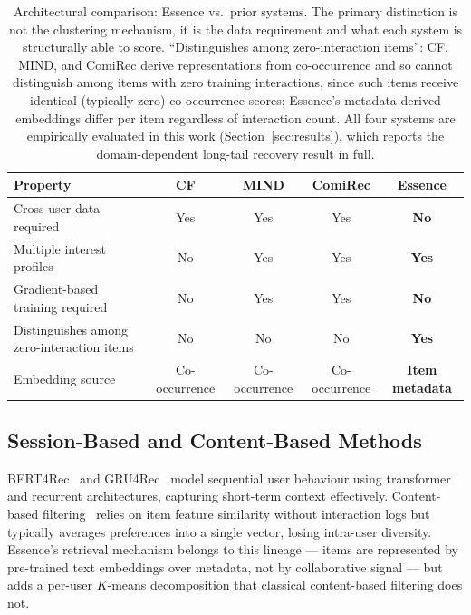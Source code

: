 \documentclass[11pt,a4paper]{article}
\begin{document}
\begin{table}[H]
\centering
\caption{Architectural comparison: Essence vs.\ prior systems.
         The primary distinction is not the clustering mechanism,
         it is the data requirement and what each system is structurally
         able to score. ``Distinguishes among zero-interaction items'':
         CF, MIND, and ComiRec derive representations from co-occurrence
         and so cannot distinguish among items with zero training
         interactions, since such items receive identical (typically
         zero) co-occurrence scores; Essence's metadata-derived
         embeddings differ per item regardless of interaction count.
         All four systems are empirically evaluated in this work
         (Section~\ref{sec:results}), which reports the domain-dependent
         long-tail recovery result in full.}
\label{tab:comparison}
\begin{tabular}{lcccc}
\toprule
\textbf{Property} & \textbf{CF} & \textbf{MIND} & \textbf{ComiRec}
                  & \textbf{Essence} \\
\midrule
Cross-user data required    & Yes  & Yes  & Yes  & \textbf{No}  \\
Multiple interest profiles  & No   & Yes  & Yes  & \textbf{Yes} \\
Gradient-based training required & No  & Yes  & Yes  & \textbf{No}  \\
Distinguishes among zero-interaction items & No & No & No & \textbf{Yes} \\
Embedding source            & Co-occurrence & Co-occurrence
                            & Co-occurrence & \textbf{Item metadata} \\
\bottomrule
\end{tabular}
\end{table}

\subsection{Session-Based and Content-Based Methods}
BERT4Rec~\cite{sun2019} and GRU4Rec~\cite{hidasi2016} model sequential user
behaviour using transformer and recurrent architectures, capturing short-term
context effectively. Content-based filtering~\cite{pazzani2007} relies on item feature
similarity without interaction logs but typically averages preferences
into a single vector, losing intra-user diversity. Essence's retrieval
mechanism belongs to this lineage --- items are represented by
pre-trained text embeddings over metadata, not by collaborative signal
--- but adds a per-user $K$-means decomposition that classical
content-based filtering does not.
\end{document}

